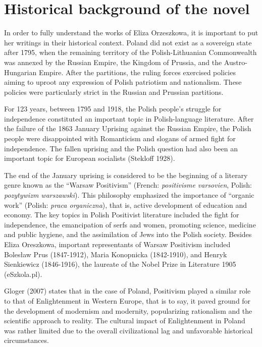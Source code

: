 \section{Historical background of the novel}

In order to fully understand the works of Eliza Orzeszkowa, it is important to put her writings in their historical context.
Poland did not exist as a sovereign state after 1795, when the remaining territory of the Polish-Lithuanian Commonwealth was annexed by the Russian Empire, the  Kingdom of Prussia, and the Austro-Hungarian Empire.
After the partitions, the ruling forces exercised policies aiming to uproot any expression of Polish patriotism and nationalism. These policies were particularly strict in the Russian and Prussian partitions.

For 123 years, between 1795 and 1918, the Polish people's struggle for independence constituted an important topic in Polish-language literature.
After the failure of the 1863 January Uprising against the Russian Empire, the Polish people were disappointed with Romanticism and slogans of armed fight for independence.
The fallen uprising and the Polish question had also been an important topic for European socialists
(Stekloff 1928).

The end of the January uprising is considered to be the beginning of a literary genre known as the ``Warsaw Positivism'' (French: \textit{positivisme varsovien}, Polish: \textit{pozytywizm warszawski}).
This philosophy emphasized the importance of ``organic work'' (Polish: \textit{praca organiczna}), that is, active development of education and economy.
The key topics in Polish Positivist literature included the fight for independence, the emancipation of serfs and women, promoting science, medicine and public hygiene, and the assimilation of Jews into the Polish society.
Besides Eliza Oreszkowa, important representants of Warsaw Positivism included Bolesław Prus (1847-1912), Maria Konopnicka (1842-1910), and Henryk Sienkiewicz (1846-1916), the laureate of the Nobel Prize in Literature 1905
(eSzkola.pl).

Gloger (2007) states that in the case of Poland, Positivism played a similar role to that of Enlightenment in Western Europe, that is to say, it paved ground for the development of modernism and modernity, popularizing rationalism and the scientific approach to reality. The cultural impact of Enlightenment in Poland was rather limited due to the overall civilizational lag and unfavorable historical circumstances.

